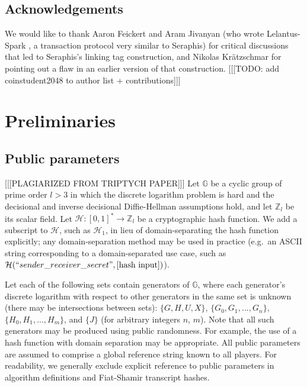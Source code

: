 \subsection{Acknowledgements}
\label{subsec:intro-acknowledgements}

We would like to thank Aaron Feickert and Aram Jivanyan (who wrote Lelantus-Spark \cite{lelantus-spark}, a transaction protocol very similar to Seraphis) for critical discussions that led to Seraphis's linking tag construction, and Nikolas Kr{\"{a}}tzschmar for pointing out a flaw in an earlier version of that construction. [[[TODO: add coinstudent2048 to author list + contributions]]]



\section{Preliminaries}
\label{sec:preliminaries}

\subsection{Public parameters}
\label{subsec:preliminaries-public-parameters}

[[[PLAGIARIZED FROM TRIPTYCH PAPER]]] Let $\mathbb{G}$ be a cyclic group of prime order $l > 3$ in which the discrete logarithm problem is hard and the decisional and inverse decisional Diffie-Hellman assumptions hold, and let $\mathbb{Z}_l$ be its scalar field. Let $\mathcal{H}: [0,1]^* \to \mathbb{Z}_l$ be a cryptographic hash function. We add a subscript to $\mathcal{H}$, such as $\mathcal{H}_1$, in lieu of domain-separating the hash function explicitly; any domain-separation method may be used in practice (e.g.\ an ASCII string corresponding to a domain-separated use case, such as $\mathcal{H}(``sender\_receiver\_secret",[\textrm{hash input}])$).

Let each of the following sets contain generators of $\mathbb{G}$, where each generator's discrete logarithm with respect to other generators in the same set is unknown (there may be intersections between sets): $\{G, H, U, X\}$, $\{G_0, G_1,...,G_n\}$, $\{H_0, H_1,...,H_m\}$, and $\{J\}$ (for arbitrary integers $n$, $m$). Note that all such generators may be produced using public randomness. For example, the use of a hash function with domain separation may be appropriate. All public parameters are assumed to comprise a global reference string known to all players. For readability, we generally exclude explicit reference to public parameters in algorithm definitions and Fiat-Shamir transcript hashes.


